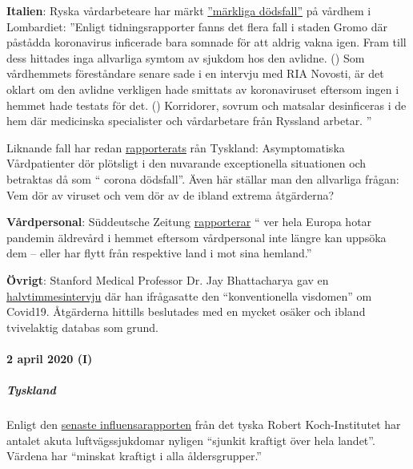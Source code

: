\textbf{Italien}: Ryska vårdarbeteare har märkt
\href{https://de.sputniknews.com/panorama/20200402326767475-fachpersonal-todesfaelle-lombardei-zeitung/}{''märkliga
dödsfall''} på vårdhem i Lombardiet: ''Enligt tidningsrapporter fanns
det flera fall i staden Gromo där påstådda koronavirus inficerade bara
somnade för att aldrig vakna igen. Fram till dess hittades inga
allvarliga symtom av sjukdom hos den avlidne. () Som vårdhemmets
föreståndare senare sade i en intervju med RIA Novosti, är det oklart om
den avlidne verkligen hade smittats av koronaviruset eftersom ingen i
hemmet hade testats för det. () Korridorer, sovrum och matsalar
desinficeras i de hem där medicinska specialister och vårdarbetare från
Ryssland arbetar. ''

Liknande fall har redan
\href{https://web.archive.org/web/20200330082928/https://www.sueddeutsche.de/panorama/coronavirus-news-deutschland-wolfsburg-laschet-1.4828033}{rapporterats}
rån Tyskland: Asymptomatiska Vårdpatienter dör plötsligt i den nuvarande
exceptionella situationen och betraktas då som `` corona dödsfall''.
Även här ställar man den allvarliga frågan: Vem dör av viruset och vem
dör av de ibland extrema åtgärderna?

\textbf{Vårdpersonal}: Süddeutsche Zeitung
\href{https://www.sueddeutsche.de/politik/coronavirus-pflegekraefte-ausland-1.4866124}{rapporterar}
`` ver hela Europa hotar pandemin äldrevård i hemmet eftersom
vårdpersonal inte längre kan uppsöka dem -- eller har flytt från
respektive land i mot sina hemland.''

\textbf{Övrigt}: Stanford Medical Professor Dr. Jay Bhattacharya gav en
\href{https://www.youtube.com/watch?v=-UO3Wd5urg0}{halvtimmesintervju}
där han ifrågasatte den ``konventionella visdomen'' om Covid19.
Åtgärderna hittills beslutades med en mycket osäker och ibland
tvivelaktig databas som grund.

\hypertarget{2-april-2020-i}{%
\paragraph{2 april 2020 (I)}\label{2-april-2020-i}}

\hypertarget{tyskland}{%
\subparagraph{\texorpdfstring{\textbf{Tyskland}}{Tyskland}}\label{tyskland}}

Enligt den
\href{https://influenza.rki.de/Wochenberichte/2019_2020/2020-13.pdf}{senaste
influensarapporten} från det tyska Robert Koch-Institutet har antalet
akuta luftvägssjukdomar nyligen ``sjunkit kraftigt över hela landet''.
Värdena har ``minskat kraftigt i alla åldersgrupper.''

